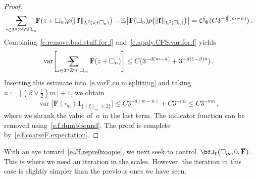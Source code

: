 \documentclass[11pt,twoside]{article} %
\makeatletter
\let\oldsquare\square %
\renewcommand{\square}{\oldsquare}
\numberwithin{equation}{section}
\theoremstyle{definition}
\newcommand*{\Z}{\ensuremath{\mathbb{Z}}}
\newcommand{\f}{\mathbf{f}}
\newcommand{\cu}{\square}
\newcommand{\E}{\mathbb{E}}
\renewcommand{\O}{\mathcal{O}}
\newcommand{\indc}{\boldsymbol{1}}
\DeclareMathOperator{\var}{var}
\newcommand{\avsum}{\mathop{\mathpalette\avsuminner\relax}\displaylimits}
\newcommand\avsuminner[2]{%
  {\sbox0{$\m@th#1\sum$}%
   \vphantom{\usebox0}%
   \ooalign{%
     \hidewidth
     \smash{\,\rule[.23em]{8.8pt}{1.1pt} \relax}%
     \hidewidth\cr
   ~$\m@th#1\sum$\cr
   }%
  }%
}
\newcommand{\bfF}{\mathbf{F}}
\makeatother
\begin{document}
\begin{proof}
\begin{equation}
\label{e.apply.CFS.var.for.f}
\avsum_{z \in 3^n \Z^d \cap \cu_m} \!\!  \bfF(z+\cu_n)  \rho\bigl( \| \f \|_{\underline{L}^2(z+\cu_n)} \bigr)
-
\E \bigl[ \bfF(\cu_n)  \rho\bigl( \| \f \|_{\underline{L}^2(\cu_n)} \bigr) \bigr] 
=
\O_\Psi (C3^{-\frac d2(m-n)}) \,.
\end{equation}
Combining~\eqref{e.remove.bad.stuff.for.f} and~\eqref{e.apply.CFS.var.for.f} yields
\begin{equation*}
\var \Biggl[ \avsum_{z \in 3^n \Z^d \cap \cu_m} \bfF(z+\cu_n)  \Biggr]
\leq 
C( 3^{-d(m-n)} + 3^{-d(1-\beta)n}) \,.
\end{equation*}
Inserting this estimate into~\eqref{e.varF.cu.m.splitting} and taking~$n:= \lceil (\beta \vee \tfrac12) m \rceil+1$, we obtain
\begin{equation*}
\var \bigl[ \bfF(\cu_m) \indc_{\{ \| \f \|_{\cu_m} \leq 2 \}} \bigr] 
\leq 
C3^{-d(m-n)}
+
C3^{-n\alpha} 
\leq 
C3^{-m\alpha}\,,
\end{equation*}
where we shrank the value of~$\alpha$ in the last term. 
The indicator function can be removed using~\eqref{e.f.dumbbound}. 
The proof is complete by~\eqref{e.f.coarseF.expectation}. 
\end{proof}

With an eye toward~\eqref{e.Jf.repre0zoopie}, we next seek to control~$\bfJ_{\f}(\cu_{m},0,\overline{\bfF})$. This is where we need an iteration in the scales. However, the iteration in this case is slightly simpler than the previous ones we have seen.
\end{document}
